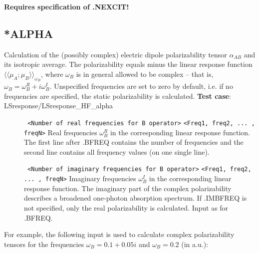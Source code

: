 {\bf Requires specification of .NEXCIT!}\newline

\subsection{*ALPHA}\label{subsec:alpha}
Calculation of the (possibly complex) 
electric dipole polarizability tensor $\alpha_{AB}$ and its isotropic average.
The polarizability equals minus the linear response function
$\langle\langle \mu_A; \mu_B \rangle\rangle_{\omega_B}$, where
$\omega_B$ is in general allowed to be complex -- that is,
$\omega_B = \omega_B^R + i \omega_B^I$.
Unspecified frequencies are set to zero by default,
i.e. if no frequencies are specified, the static polarizability is calculated.
\newline
{\bf Test case}: LSresponse/LSresponse\_HF\_alpha 
\begin{description}
\item[] \verb| | \newline
\verb|<Number of real frequencies for B operator>|\newline
\verb|<Freq1, freq2, ... , freqN>|\newline
Real frequencies $\omega_B^R$ in the corresponding linear response function.
The first line after .BFREQ contains the number of frequencies
and the second line contains all frequency values (on one single line).
\item[] \verb| | \newline
\verb|<Number of imaginary frequencies for B operator>|\newline
\verb|<Freq1, freq2, ... , freqN>|\newline
Imaginary frequencies $\omega_B^I$ in the corresponding
linear response function.
The imaginary part of the complex polarizability describes a broadened one-photon
absorption spectrum.
If .IMBFREQ is not specified, only the real polarizability is calculated.
Input as for .BFREQ. 
\end{description}
For example, the following input is used 
to calculate complex polarizability tensors
for the frequencies $\omega_B = 0.1 + 0.05i$ and $\omega_B = 0.2$ 
(in a.u.):
\begin{description}
\item[]
\item[]
\item[]
\item[]
\item[]
\item[]
\item[]
\item[]
\end{description}


